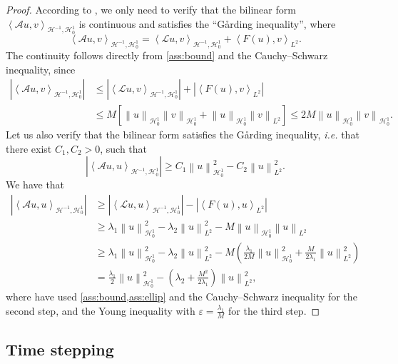 \documentclass[11pt,a4paper,reqno]{amsart}
\numberwithin{equation}{section}
\theoremstyle{plain}
\theoremstyle{definition}
\newcommand{\ip}[1]{\left\langle#1\right\rangle}
\newcommand{\cL}{\mathcal{L}}
\newcommand{\cH}{\mathcal{H}}
\newcommand{\norm}[1]{\left\|#1 \right\|} %
\newcommand{\abs}[1]{\left|#1\right|} %
\begin{document}
\begin{proof}
According to \citet[Theorem 3.2.2]{hilber2013computational}, we only need to verify that the bilinear form $\ip{\mathcal{A} u, v}_{\cH^{-1},\cH_0^1}$ is continuous and satisfies the “G\aa rding inequality”, where 
\[
\ip{\mathcal{A} u, v}_{\cH^{-1},\cH_0^1}= \ip{\cL u, v}_{\cH^{-1},\cH_0^1} + \ip{F(u), v}_{L^2}.
\]
The continuity follows directly from \cref{ass:bound} and the Cauchy--Schwarz inequality, since
\begin{align*}
\abs{\ip{\mathcal{A} u, v}_{\cH^{-1},\cH_0^1}}
    & \le \abs{\ip{\cL u,v}_{\cH^{-1},\cH_0^1}}  + \abs{\ip{F(u), v}_{L^2}} \\ 
    & \le M \left[ \norm{u}_{\cH_0^1} \norm{ v}_{\cH_0^1} + \norm{u}_{\cH_0^1} \norm{v}_{L^2} \right] 
      \le 2M \norm{u}_{\cH_0^1} \norm{v}_{\cH_0^1}.
\end{align*}
Let us also verify that the bilinear form satisfies the G\aa rding inequality, \emph{i.e.} that there exist $C_1, C_2 > 0$, such that
\[
\abs{\ip{\mathcal{A} u, u}_{\cH^{-1},\cH_0^1}} \ge C_1 \norm{u}_{\cH_0^1}^2 - C_2 \norm{u}_{L^2}^2.
\]
We have that 
\begin{align*}
\abs{\ip{\mathcal{A} u, u}_{\cH^{-1},\cH_0^1}}
    & \ge \abs{\ip{\mathcal{L} u, u}_{\cH^{-1},\cH_0^1}} - \abs{\ip{F(u), u}_{L^2}} \\ 
    & \ge \lambda_1 \norm{u}_{\cH_0^1}^2 - \lambda_2 \norm{u}^2_{L^2} - M \norm{u}_{\cH_0^1} \norm{u}_{L^2}  \\ 
    & \ge \lambda_1 \norm{u}_{\cH_0^1}^2 - \lambda_2 \norm{u}^2_{L^2} - M \left(  \frac{\lambda_1}{2M} \norm{u}_{\cH_0^1}^2 + \frac{M}{2 \lambda_1} \norm{u}_{L^2}^2 \right) \\ 
    & = \frac{\lambda_1}{2} \norm{u}_{\cH_0^1}^2 - \left( \lambda_2 + \frac{M^2}{2 \lambda_1} \right) \norm{u}^2_{L^2},
\end{align*}
where have used \cref{ass:bound,ass:ellip} and the Cauchy--Schwarz inequality for the second step, and the Young inequality with $\varepsilon = \frac{\lambda_1}{M}$ for the third step.
\end{proof}


\subsection{Time stepping}
\label{sec:time}
\end{document}
